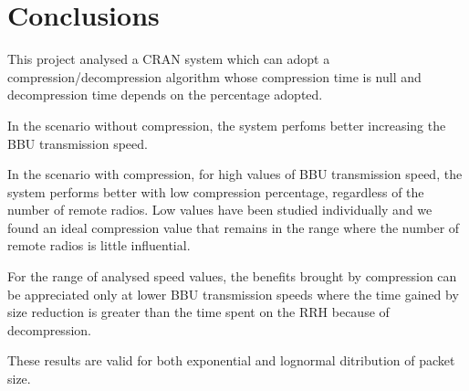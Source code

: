 \documentclass[11pt,a4paper,oneside, openright]{article}
\begin{document}
\section{Conclusions}
This project analysed a CRAN system which can adopt a compression/decompression algorithm whose compression time is null and decompression time depends on the percentage adopted.

In the scenario without compression, the system perfoms better increasing the BBU transmission speed.

In the scenario with compression, for high values of BBU transmission speed, the system performs better with low compression percentage, regardless of the number of remote radios. Low values have been studied individually and we found an ideal compression value that remains in the range where the number of remote radios is little influential.

For the range of analysed speed values, the benefits brought by compression can be appreciated only at lower BBU transmission speeds where the time gained by size reduction is greater than the time spent on the RRH because of decompression. 

These results are valid for both exponential and lognormal ditribution of packet size.
\end{document}
